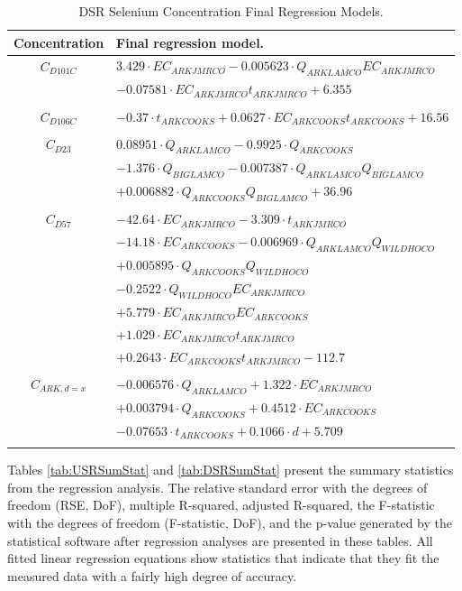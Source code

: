 \begin{table}[htbp]
	\centering
	\caption{DSR Selenium Concentration Final Regression Models.}
	\label{tab:DSRFinalRegression}
	\begin{tabular}{c l}
		\toprule
		Concentration	& Final regression model.\\
		\toprule
		$ C_{D101C} $	& $3.429 \cdot EC_{ARKJMRCO} - 0.005623 \cdot Q_{ARKLAMCO}EC_{ARKJMRCO}$\\
		& $-0.07581 \cdot EC_{ARKJMRCO}t_{ARKJMRCO} + 6.355$\\
		\\
		$ C_{D106C} $	& $-0.37 \cdot t_{ARKCOOKS}+ 0.0627 \cdot EC_{ARKCOOKS}t_{ARKCOOKS} + 16.56$\\
		\\
		$ C_{D23} $		& $0.08951 \cdot Q_{ARKLAMCO} -0.9925 \cdot Q_{ARKCOOKS}$\\
		& $-1.376 \cdot Q_{BIGLAMCO} -0.007387 \cdot Q_{ARKLAMCO}Q_{BIGLAMCO}$\\
		& $+0.006882 \cdot Q_{ARKCOOKS}Q_{BIGLAMCO} + 36.96$\\ 
		\\
		$ C_{D57} $		& $-42.64 \cdot EC_{ARKJMRCO} -3.309 \cdot t_{ARKJMRCO}$\\
		& $-14.18 \cdot EC_{ARKCOOKS} -0.006969 \cdot Q_{ARKLAMCO}Q_{WILDHOCO}$\\
		& $+0.005895 \cdot Q_{ARKCOOKS}Q_{WILDHOCO}$\\
		& $-0.2522 \cdot Q_{WILDHOCO}EC_{ARKJMRCO}$\\
		& $+5.779 \cdot EC_{ARKJMRCO}EC_{ARKCOOKS}$\\
		& $+1.029 \cdot EC_{ARKJMRCO}t_{ARKJMRCO}$\\
		& $+0.2643 \cdot EC_{ARKCOOKS}t_{ARKJMRCO} -112.7$\\
		\\
		$ C_{ARK,d=x} $		& $-0.006576 \cdot Q_{ARKLAMCO} +1.322 \cdot EC_{ARKJMRCO}$\\
		& $+0.003794 \cdot Q_{ARKCOOKS} +0.4512 \cdot EC_{ARKCOOKS}$\\
		& $-0.07653 \cdot t_{ARKCOOKS} +0.1066 \cdot d + 5.709$\\
		\bottomrule \\
	\end{tabular}
\end{table}

Tables \ref{tab:USRSumStat} and \ref{tab:DSRSumStat} present the summary statistics from the regression analysis.  The relative standard error with the degrees of freedom (RSE, DoF), multiple R-squared, adjusted R-squared, the F-statistic with the degrees of freedom (F-statistic, DoF), and the p-value generated by the statistical software after regression analyses are presented in these tables.  All fitted linear regression equations show statistics that indicate that they fit the measured data with a fairly high degree of accuracy.

